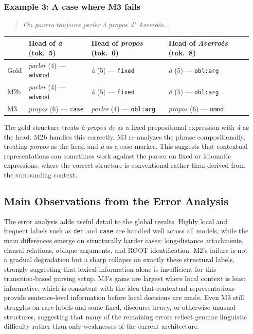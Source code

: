 \documentclass[12pt,letterpaper]{article}
\begin{document}
\subsubsection*{Example 3: A case where M3 fails}

\begin{quote}
\textit{On pourra toujours parler à propos d' Averroès...}
\end{quote}

\begin{center}
\small
\begin{tabular}{llll}
\toprule
& \textbf{Head of \textit{à} (tok.\ 5)} & \textbf{Head of \textit{propos} (tok.\ 6)} & \textbf{Head of \textit{Averroès} (tok.\ 8)} \\
\midrule
Gold  & \textit{parler} (4) — \texttt{advmod} & \textit{à} (5) — \texttt{fixed}    & \textit{à} (5) — \texttt{obl:arg} \\
M2b   & \textit{parler} (4) — \texttt{advmod} & \textit{à} (5) — \texttt{fixed}    & \textit{à} (5) — \texttt{obl:arg} \\
M3    & \textit{propos} (6) — \texttt{case}   & \textit{parler} (4) — \texttt{obl:arg} & \textit{propos} (6) — \texttt{nmod} \\
\bottomrule
\end{tabular}
\end{center}
\FloatBarrier
The gold structure treats \textit{à propos de} as a fixed prepositional expression with \textit{à} as the head. M2b handles this correctly. M3 re-analyzes the phrase compositionally, treating \textit{propos} as the head and \textit{à} as a case marker. This suggests that contextual representations can sometimes work against the parser on fixed or idiomatic expressions, where the correct structure is conventional rather than derived from the surrounding context.

\subsection{Main Observations from the Error Analysis}
\label{subsec:error_observations}

The error analysis adds useful detail to the global results. Highly local 
and frequent labels such as \texttt{det} and \texttt{case} are handled well 
across all models, while the main differences emerge on structurally harder 
cases: long-distance attachments, clausal relations, oblique arguments, and 
ROOT identification. M2's failure is not a gradual degradation but a sharp 
collapse on exactly these structural labels, strongly suggesting that lexical 
information alone is insufficient for this transition-based parsing setup. 
M3's gains are largest where local context is least informative, which is 
consistent with the idea that contextual representations provide sentence-level 
information before local decisions are made. Even M3 still struggles on rare 
labels and some fixed, discourse-heavy, or otherwise unusual structures, 
suggesting that many of the remaining errors reflect genuine linguistic 
difficulty rather than only weaknesses of the current architecture.
\end{document}
